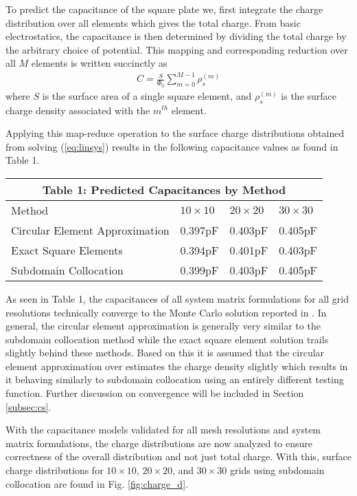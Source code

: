 To predict the capacitance of the square plate we, first integrate the charge distribution over all elements which gives the total charge. From basic electrostatics, the capacitance is then determined by dividing the total charge by the arbitrary choice of potential. This mapping and corresponding reduction over all $M$ elements is written succinctly as 
\begin{align}
	C=\frac{S}{\Phi_0}\sum_{m=0}^{M-1}\rho_{s}^{(m)}
\end{align}
where $S$ is the surface area of a single square element, and $\rho_{s}^{(m)}$ is the surface charge density associated with the $m^{th}$ element.

Applying this map-reduce operation to the surface charge distributions obtained from solving (\ref{eq:linsys}) results in the following capacitance values as found in Table 1.

\begin{table}[h!]
	\centering
\begin{tabular}{ |p{2cm}||p{1cm}|p{1cm}|p{1cm}|}
	\multicolumn{4}{c}{Table 1: Predicted Capacitances by Method} \\
	\hline
	Method & $10\times10$ & $20\times20$ & $30\times30$ \\
	\hline
	Circular Element Approximation   & 0.397pF &0.403pF & 0.405pF\\
	\hline
	Exact Square Elements& 0.394pF& 0.401pF & 0.403pF\\
	\hline
	Subdomain Collocation&0.399pF & 0.403pF & 0.405pF \\
	\hline
   \end{tabular}
   \label{tab:capvals}
\end{table}

As seen in Table 1, the capacitances of all system matrix formulations for all grid resolutions technically converge to the Monte Carlo solution reported in \cite{randomwalk}. In general, the circular element approximation is generally very similar to the subdomain collocation method while the exact square element solution trails slightly behind these methods. Based on this it is assumed that the circular element approximation over estimates the charge density slightly which results in it behaving similarly to subdomain collocation using an entirely different testing function. Further discussion on convergence will be included in Section \ref{subsec:cs}. 

With the capacitance models validated for all mesh resolutions and system matrix formulations, the charge distributions are now analyzed to ensure correctness of the overall distribution and not just total charge. With this, surface charge distributions for $10\times10$, $20\times20$, and $30\times30$ grids using subdomain collocation are found in Fig. \ref{fig:charge_d}. 

